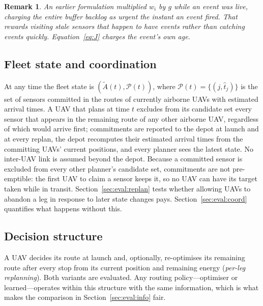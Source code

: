 \documentclass[journal,outdir=./]{IEEEtran}
\newtheorem{remark}{Remark}
\begin{document}
\begin{remark}
An earlier formulation multiplied $w_i$ by $g$ while an event was live, charging the entire buffer backlog as urgent the instant an event fired. That rewards visiting stale sensors that happen to have events rather than catching events quickly. Equation~\eqref{eq:J} charges the event's own age.
\end{remark}

\subsection{Fleet state and coordination}\label{sec:model:coord}
At any time the fleet state is $(\tilde A(t),\mathcal{P}(t))$, where $\mathcal{P}(t)=\{(j,\hat t_j)\}$ is the set of sensors committed in the routes of currently airborne UAVs with estimated arrival times. A UAV that plans at time $t$ excludes from its candidate set every sensor that appears in the remaining route of any other airborne UAV, regardless of which would arrive first; commitments are reported to the depot at launch and at every replan, the depot recomputes their estimated arrival times from the committing UAVs' current positions, and every planner sees the latest state. No inter-UAV link is assumed beyond the depot. Because a committed sensor is excluded from every other planner's candidate set, commitments are not pre-emptible: the first UAV to claim a sensor keeps it, so no UAV can have its target taken while in transit. Section~\ref{sec:eval:replan} tests whether allowing UAVs to abandon a leg in response to later state changes pays. Section~\ref{sec:eval:coord} quantifies what happens without this.

\subsection{Decision structure}
A UAV decides its route at launch and, optionally, re-optimises its remaining route after every stop from its current position and remaining energy (\emph{per-leg replanning}). Both variants are evaluated. Any routing policy---optimiser or learned---operates within this structure with the same information, which is what makes the comparison in Section~\ref{sec:eval:info} fair.
\end{document}

